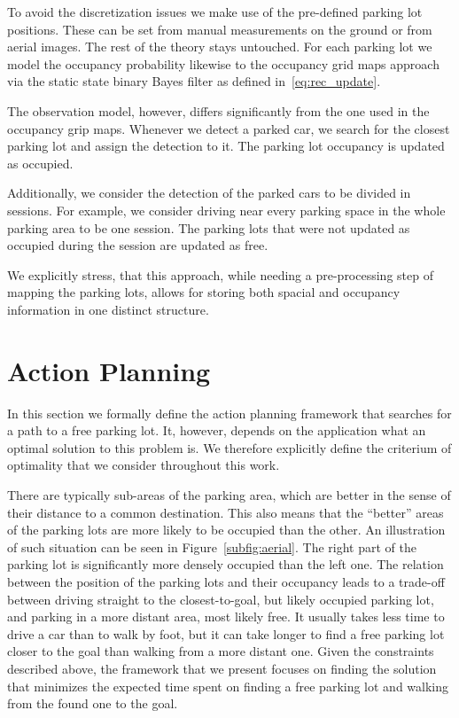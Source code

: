 To avoid the discretization issues we make use of the pre-defined parking lot
positions. These can be set from manual measurements on the ground or from
aerial images. The rest of the theory stays untouched. For each parking lot we
model the occupancy probability likewise to the occupancy grid maps approach
via the static state binary Bayes filter as defined in~\eqref{eq:rec_update}.

The observation model, however, differs significantly from the one used in the
occupancy grip maps. Whenever we detect a parked car, we search for the
closest parking lot and assign the detection to it. The parking lot occupancy
is updated as occupied.

Additionally, we consider the detection of the parked cars to be divided in
sessions. For example, we consider driving near every parking space in the
whole parking area to be one session. The parking lots that were not updated
as occupied during the session are updated as free.

We explicitly stress, that this approach, while needing a pre-processing step
of mapping the parking lots, allows for storing both spacial and occupancy
information in one distinct structure.


\section{Action Planning} %
\label{sec:action_planning}

In this section we formally define the action planning framework that searches
for a path to a free parking lot. It, however, depends on the application what
an optimal solution to this problem is. We therefore explicitly define the
criterium of optimality that we consider throughout this work.

There are typically sub-areas of the parking area, which are better in the
sense of their distance to a common destination. This also means that the
``better'' areas of the parking lots are more likely to be occupied than the
other. An illustration of such situation can be seen in
Figure~\ref{subfig:aerial}. The right part of the parking lot is significantly
more densely occupied than the left one. The relation between the position of
the parking lots and their occupancy leads to a trade-off between driving
straight to the closest-to-goal, but likely occupied parking lot, and parking
in a more distant area, most likely free. It usually takes less time to drive
a car than to walk by foot, but it can take longer to find a free parking lot
closer to the goal than walking from a more distant one. Given the constraints
described above, the framework that we present focuses on finding the solution
that minimizes the expected time spent on finding a free parking lot and
walking from the found one to the goal.

